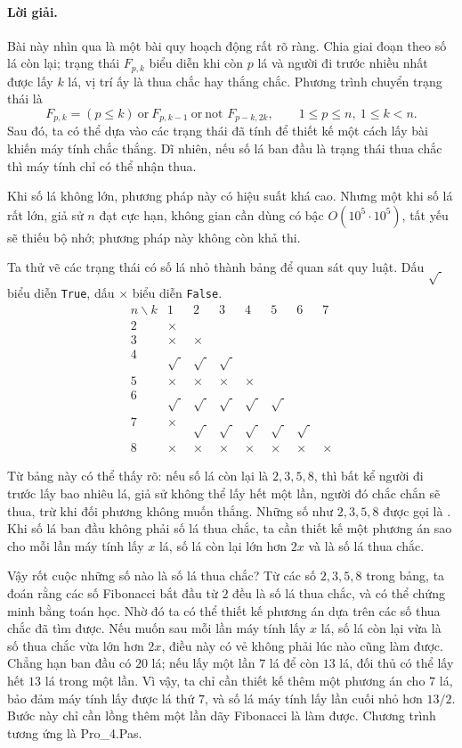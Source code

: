 \documentclass[11pt]{article}
\begin{document}
\paragraph{Lời giải.}
Bài này nhìn qua là một bài quy hoạch động rất rõ ràng. Chia giai đoạn theo
số lá còn lại; trạng thái \(F_{p,k}\) biểu diễn khi còn \(p\) lá và người đi
trước nhiều nhất được lấy \(k\) lá, vị trí ấy là thua chắc hay thắng chắc.
Phương trình chuyển trạng thái là
\[
  F_{p,k}=(p\le k)\ \text{or}\ F_{p,k-1}\ \text{or}\ \text{not }F_{p-k,2k},
  \qquad 1\le p\le n,\ 1\le k<n.
\]
Sau đó, ta có thể dựa vào các trạng thái đã tính để thiết kế một cách lấy bài
khiến máy tính chắc thắng. Dĩ nhiên, nếu số lá ban đầu là trạng thái thua
chắc thì máy tính chỉ có thể nhận thua.

Khi số lá không lớn, phương pháp này có hiệu suất khá cao. Nhưng một khi số
lá rất lớn, giả sử \(n\) đạt cực hạn, không gian cần dùng có bậc
\(O(10^5\cdot10^5)\), tất yếu sẽ thiếu bộ nhớ; phương pháp này không còn khả
thi.

Ta thử vẽ các trạng thái có số lá nhỏ thành bảng để quan sát quy luật. Dấu
\(\sqrt{\ }\) biểu diễn \texttt{True}, dấu \(\times\) biểu diễn
\texttt{False}.
\[
\begin{array}{c|ccccccc}
n\backslash k & 1&2&3&4&5&6&7\\
\hline
2 & \times\\
3 & \times&\times\\
4 & \sqrt{\ }&\sqrt{\ }&\sqrt{\ }\\
5 & \times&\times&\times&\times\\
6 & \sqrt{\ }&\sqrt{\ }&\sqrt{\ }&\sqrt{\ }&\sqrt{\ }\\
7 & \times&\sqrt{\ }&\sqrt{\ }&\sqrt{\ }&\sqrt{\ }&\sqrt{\ }\\
8 & \times&\times&\times&\times&\times&\times&\times
\end{array}
\]

Từ bảng này có thể thấy rõ: nếu số lá còn lại là \(2,3,5,8\), thì bất kể
người đi trước lấy bao nhiêu lá, giả sử không thể lấy hết một lần, người đó
chắc chắn sẽ thua, trừ khi đối phương không muốn thắng. Những số như
\(2,3,5,8\) được gọi là . Khi số lá ban đầu không phải
số lá thua chắc, ta cần thiết kế một phương án sao cho mỗi lần máy tính lấy
\(x\) lá, số lá còn lại lớn hơn \(2x\) và là số lá thua chắc.

Vậy rốt cuộc những số nào là số lá thua chắc? Từ các số \(2,3,5,8\) trong
bảng, ta đoán rằng các số Fibonacci bắt đầu từ \(2\) đều là số lá thua chắc,
và có thể chứng minh bằng toán học. Nhờ đó ta có thể thiết kế phương án dựa
trên các số thua chắc đã tìm được. Nếu muốn sau mỗi lần máy tính lấy \(x\)
lá, số lá còn lại vừa là số thua chắc vừa lớn hơn \(2x\), điều này có vẻ
không phải lúc nào cũng làm được. Chẳng hạn ban đầu có \(20\) lá; nếu lấy
một lần \(7\) lá để còn \(13\) lá, đối thủ có thể lấy hết \(13\) lá trong một
lần. Vì vậy, ta chỉ cần thiết kế thêm một phương án cho \(7\) lá, bảo đảm
máy tính lấy được lá thứ \(7\), và số lá máy tính lấy lần cuối nhỏ hơn
\(13/2\). Bước này chỉ cần lồng thêm một lần dãy Fibonacci là làm được.
Chương trình tương ứng là Pro\_4.Pas.
\end{document}

